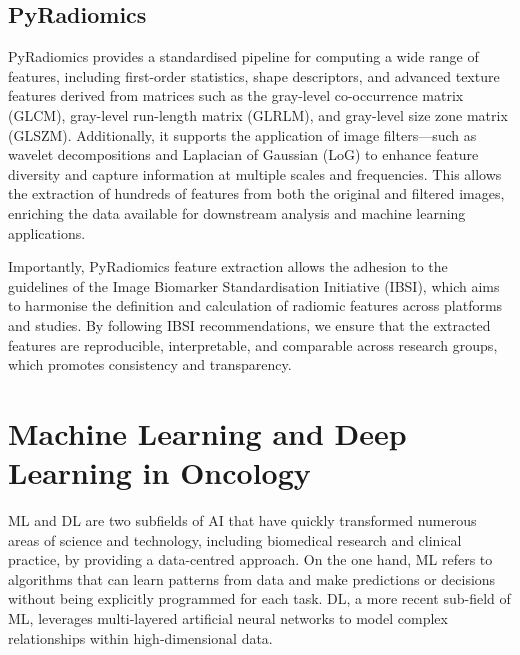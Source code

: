 \documentclass[12pt, a4paper]{report}
\begin{document}
\subsection{PyRadiomics}
PyRadiomics provides a standardised pipeline for computing a wide range of features, including first-order statistics, shape descriptors, and advanced texture features derived from matrices such as the gray-level co-occurrence matrix (GLCM), gray-level run-length matrix (GLRLM), and gray-level size zone matrix (GLSZM). Additionally, it supports the application of image filters—such as wavelet decompositions and Laplacian of Gaussian (LoG) to enhance feature diversity and capture information at multiple scales and frequencies. This allows the extraction of hundreds of features from both the original and filtered images, enriching the data available for downstream analysis and machine learning applications.

Importantly, PyRadiomics feature extraction allows the adhesion to the guidelines of the Image Biomarker Standardisation Initiative (IBSI), which aims to harmonise the definition and calculation of radiomic features across platforms and studies. By following IBSI recommendations, we ensure that the extracted features are reproducible, interpretable, and comparable across research groups, which promotes consistency and transparency.

\section{Machine Learning and Deep Learning in Oncology}

ML and DL are two subfields of AI that have quickly transformed numerous areas of science and technology, including biomedical research and clinical practice, by providing a data-centred approach. On the one hand, ML refers to algorithms that can learn patterns from data and make predictions or decisions without being explicitly programmed for each task. DL, a more recent sub-field of ML, leverages multi-layered artificial neural networks to model complex relationships within high-dimensional data. 
\end{document}
